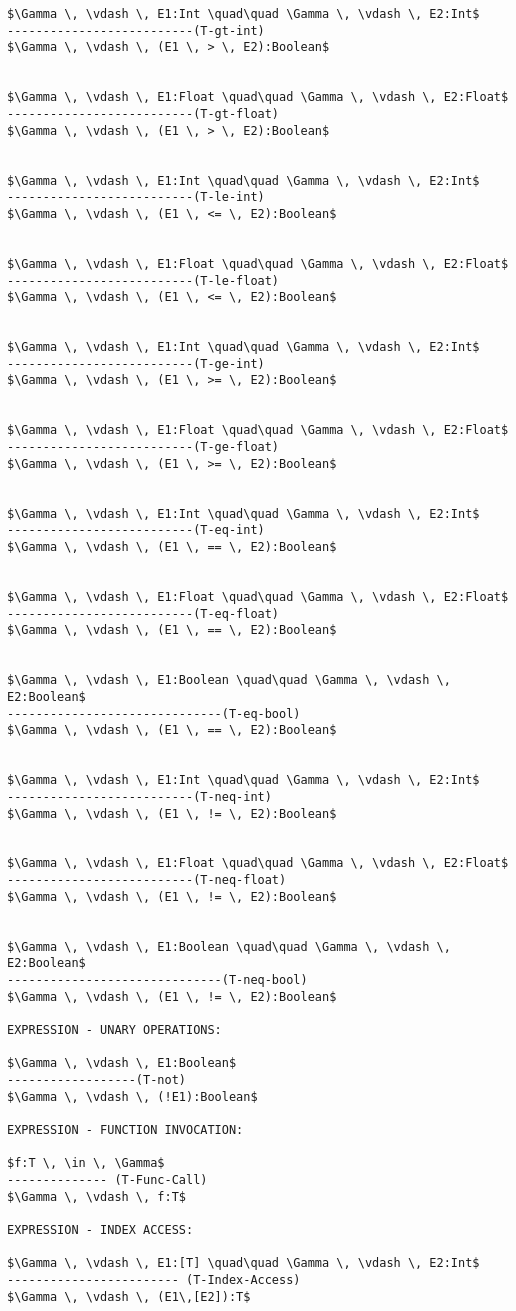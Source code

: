 \documentclass[11pt, a4paper]{article}
\begin{document}
\begin{lstlisting}
$\Gamma \, \vdash \, E1:Int \quad\quad \Gamma \, \vdash \, E2:Int$
--------------------------(T-gt-int)
$\Gamma \, \vdash \, (E1 \, > \, E2):Boolean$


$\Gamma \, \vdash \, E1:Float \quad\quad \Gamma \, \vdash \, E2:Float$
--------------------------(T-gt-float)
$\Gamma \, \vdash \, (E1 \, > \, E2):Boolean$


$\Gamma \, \vdash \, E1:Int \quad\quad \Gamma \, \vdash \, E2:Int$
--------------------------(T-le-int)
$\Gamma \, \vdash \, (E1 \, <= \, E2):Boolean$


$\Gamma \, \vdash \, E1:Float \quad\quad \Gamma \, \vdash \, E2:Float$
--------------------------(T-le-float)
$\Gamma \, \vdash \, (E1 \, <= \, E2):Boolean$


$\Gamma \, \vdash \, E1:Int \quad\quad \Gamma \, \vdash \, E2:Int$
--------------------------(T-ge-int)
$\Gamma \, \vdash \, (E1 \, >= \, E2):Boolean$


$\Gamma \, \vdash \, E1:Float \quad\quad \Gamma \, \vdash \, E2:Float$
--------------------------(T-ge-float)
$\Gamma \, \vdash \, (E1 \, >= \, E2):Boolean$


$\Gamma \, \vdash \, E1:Int \quad\quad \Gamma \, \vdash \, E2:Int$
--------------------------(T-eq-int)
$\Gamma \, \vdash \, (E1 \, == \, E2):Boolean$


$\Gamma \, \vdash \, E1:Float \quad\quad \Gamma \, \vdash \, E2:Float$
--------------------------(T-eq-float)
$\Gamma \, \vdash \, (E1 \, == \, E2):Boolean$


$\Gamma \, \vdash \, E1:Boolean \quad\quad \Gamma \, \vdash \, E2:Boolean$
------------------------------(T-eq-bool)
$\Gamma \, \vdash \, (E1 \, == \, E2):Boolean$


$\Gamma \, \vdash \, E1:Int \quad\quad \Gamma \, \vdash \, E2:Int$
--------------------------(T-neq-int)
$\Gamma \, \vdash \, (E1 \, != \, E2):Boolean$


$\Gamma \, \vdash \, E1:Float \quad\quad \Gamma \, \vdash \, E2:Float$
--------------------------(T-neq-float)
$\Gamma \, \vdash \, (E1 \, != \, E2):Boolean$


$\Gamma \, \vdash \, E1:Boolean \quad\quad \Gamma \, \vdash \, E2:Boolean$
------------------------------(T-neq-bool)
$\Gamma \, \vdash \, (E1 \, != \, E2):Boolean$

EXPRESSION - UNARY OPERATIONS:

$\Gamma \, \vdash \, E1:Boolean$
------------------(T-not)
$\Gamma \, \vdash \, (!E1):Boolean$

EXPRESSION - FUNCTION INVOCATION:

$f:T \, \in \, \Gamma$
-------------- (T-Func-Call)
$\Gamma \, \vdash \, f:T$

EXPRESSION - INDEX ACCESS:

$\Gamma \, \vdash \, E1:[T] \quad\quad \Gamma \, \vdash \, E2:Int$
------------------------ (T-Index-Access)
$\Gamma \, \vdash \, (E1\,[E2]):T$
\end{lstlisting}
\end{document}
